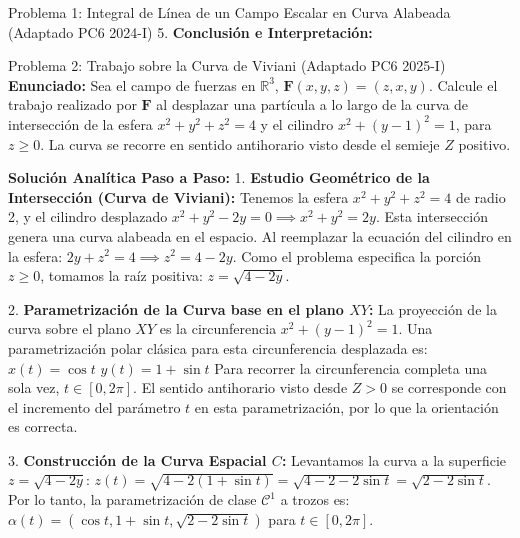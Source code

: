 \documentclass[11pt,a4paper]{article}
\begin{document}
\begin{ejerciciobox}{Problema 1: Integral de Línea de un Campo Escalar en Curva Alabeada (Adaptado PC6 2024-I)}
5. \textbf{Conclusión e Interpretación:}
\end{ejerciciobox}

\begin{ejerciciobox}{Problema 2: Trabajo sobre la Curva de Viviani (Adaptado PC6 2025-I)}
\textbf{Enunciado:}
Sea el campo de fuerzas en $\mathbb{R}^3$, $\mathbf{F}(x,y,z) = (z, x, y)$. Calcule el trabajo realizado por $\mathbf{F}$ al desplazar una partícula a lo largo de la curva de intersección de la esfera $x^2 + y^2 + z^2 = 4$ y el cilindro $x^2 + (y-1)^2 = 1$, para $z \ge 0$. La curva se recorre en sentido antihorario visto desde el semieje $Z$ positivo.

\textbf{Solución Analítica Paso a Paso:}
1. \textbf{Estudio Geométrico de la Intersección (Curva de Viviani):}
Tenemos la esfera $x^2 + y^2 + z^2 = 4$ de radio 2, y el cilindro desplazado $x^2 + y^2 - 2y = 0 \implies x^2 + y^2 = 2y$.
Esta intersección genera una curva alabeada en el espacio.
Al reemplazar la ecuación del cilindro en la esfera:
$2y + z^2 = 4 \implies z^2 = 4 - 2y$.
Como el problema especifica la porción $z \ge 0$, tomamos la raíz positiva:
$z = \sqrt{4 - 2y}$.

2. \textbf{Parametrización de la Curva base en el plano $XY$:}
La proyección de la curva sobre el plano $XY$ es la circunferencia $x^2 + (y-1)^2 = 1$.
Una parametrización polar clásica para esta circunferencia desplazada es:
$x(t) = \cos t$
$y(t) = 1 + \sin t$
Para recorrer la circunferencia completa una sola vez, $t \in [0, 2\pi]$.
El sentido antihorario visto desde $Z>0$ se corresponde con el incremento del parámetro $t$ en esta parametrización, por lo que la orientación es correcta.

3. \textbf{Construcción de la Curva Espacial $C$:}
Levantamos la curva a la superficie $z = \sqrt{4 - 2y}$:
$z(t) = \sqrt{4 - 2(1 + \sin t)} = \sqrt{4 - 2 - 2\sin t} = \sqrt{2 - 2\sin t}$.
Por lo tanto, la parametrización de clase $\mathcal{C}^1$ a trozos es:
$\alpha(t) = (\cos t, 1 + \sin t, \sqrt{2 - 2\sin t})$ para $t \in [0, 2\pi]$.


\end{ejerciciobox}
\end{document}
